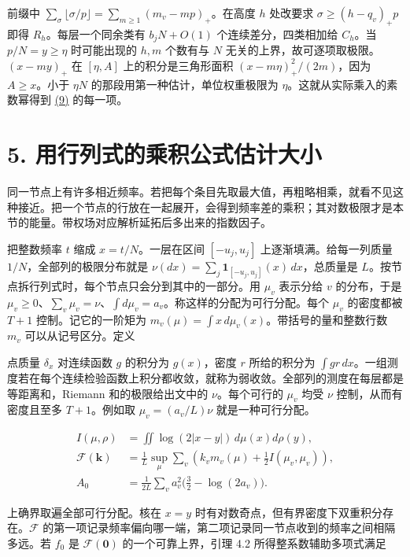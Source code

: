 \documentclass[11pt,a4paper]{article}
\begin{document}
前缀中 \(\sum_\sigma\lfloor\sigma/p\rfloor=\sum_{m\ge1}(m_v-mp)_+\)。在高度 \(h\) 处改要求 \(\sigma\ge(h-q_v)_+p\) 即得 \(R_h\)。每层一个同余类有 \(b_jN+O(1)\) 个连续差分，四类相加给 \(C_h\)。当 \(p/N=y\ge\eta\) 时可能出现的 \(h,m\) 个数有与 \(N\) 无关的上界，故可逐项取极限。\((x-my)_+\) 在 \([\eta,A]\) 上的积分是三角形面积 \((x-m\eta)_+^2/(2m)\)，因为 \(A\ge x\)。小于 \(\eta N\) 的那段用第一种估计，单位权重极限为 \(\eta\)。这就从实际乘入的素数幂得到 \hyperref[eq:9]{(9)} 的每一项。

\section{5. 用行列式的乘积公式估计大小}\label{ux7528ux884cux5217ux5f0fux7684ux4e58ux79efux516cux5f0fux4f30ux8ba1ux5927ux5c0f}

同一节点上有许多相近频率。若把每个条目先取最大值，再粗略相乘，就看不见这种接近。把一个节点的行放在一起展开，会得到频率差的乘积；其对数极限才是本节的能量。带权场对应解析延拓后多出来的指数因子。

把整数频率 \(t\) 缩成 \(x=t/N\)。一层在区间 \([-u_j,u_j]\) 上逐渐填满。给每一列质量 \(1/N\)，全部列的极限分布就是 \(\nu(dx)=\sum_j\mathbf1_{[-u_j,u_j]}(x)\,dx\)，总质量是 \(L\)。按节点拆行列式时，每个节点只会分到其中的一部分。用 \(\mu_v\) 表示分给 \(v\) 的分布，于是 \(\mu_v\ge0\)、\(\sum_v\mu_v=\nu\)、\(\int d\mu_v=a_v\)。称这样的分配为可行分配。每个 \(\mu_v\) 的密度都被 \(T+1\) 控制。记它的一阶矩为 \(m_v(\mu)=\int x\,d\mu_v(x)\)。带括号的量和整数行数 \(m_v\) 可以从记号区分。定义

点质量 \(\delta_x\) 对连续函数 \(g\) 的积分为 \(g(x)\)，密度 \(r\) 所给的积分为 \(\int gr\,dx\)。一组测度若在每个连续检验函数上积分都收敛，就称为弱收敛。全部列的测度在每层都是等距离和，Riemann 和的极限给出文中的 \(\nu\)。每个可行的 \(\mu_v\) 均受 \(\nu\) 控制，从而有密度且至多 \(T+1\)。例如取 \(\mu_v=(a_v/L)\nu\) 就是一种可行分配。

\[
 \begin{aligned}
 I(\mu,\rho)&=\iint\log(2|x-y|)\,d\mu(x)d\rho(y),\\
 \mathcal F(\mathbf k)&=\frac1L\sup_\mu\sum_v
       \left(k_v m_v(\mu)+\tfrac12 I(\mu_v,\mu_v)\right),\\
 A_0&=\frac1{2L}\sum_v a_v^2\big(\tfrac32-\log(2a_v)\big).
 \end{aligned}                                                            \tag{12}\label{eq:12}
\]

上确界取遍全部可行分配。核在 \(x=y\) 时有对数奇点，但有界密度下双重积分存在。\(\mathcal F\) 的第一项记录频率偏向哪一端，第二项记录同一节点收到的频率之间相隔多远。若 \(f_0\) 是 \(\mathcal F(\mathbf0)\) 的一个可靠上界，引理 4.2 所得整系数辅助多项式满足
\end{document}
